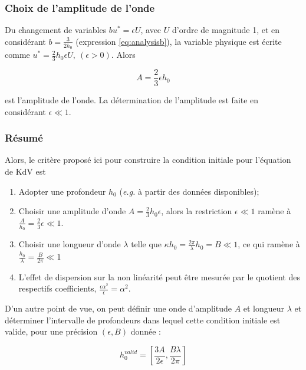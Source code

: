\subsubsection{Choix de l'amplitude de l'onde}

\indent Du changement de variables $bu^* = \epsilon U$, avec $U$ d'ordre de magnitude 1, et en considérant $b = \frac{3}{2h_0}$ (expression \ref{eq:analysisb}), la variable physique est écrite comme $u^* = \frac{2}{3}h_0\epsilon U, \ (\epsilon > 0)$. Alors

\begin{equation*}
A = \frac{2}{3}\epsilon h_0
\end{equation*}

\noindent est l'amplitude de l'onde. La détermination de l'amplitude est faite en considérant $\epsilon \ll 1$. 

\subsubsection{Résumé}

\indent Alors, le critère proposé ici pour construire la condition initiale pour l'équation de KdV est 

\begin{enumerate}
\item Adopter une profondeur $h_0$ (\emph{e.g.} à partir des données disponibles);
\item Choisir une amplitude d'onde $A = \frac{2}{3}h_0\epsilon$, alors la restriction $\epsilon \ll 1$ ramène à $\frac{A}{h_0} = \frac{2}{3}\epsilon \ll 1$.
\item Choisir une longueur d'onde $\lambda$ telle que $\kappa h_0 = \frac{2\pi}{\lambda}h_0 = B \ll 1$, ce qui ramène à $\frac{h_0}{\lambda} = \frac{B}{2\pi} \ll 1$
\item L'effet de dispersion sur la non linéarité peut être mesurée par le quotient des respectifs coefficients, $\frac{\epsilon \alpha^2}{\epsilon} = \alpha^2$.
\end{enumerate}

\indent D'un autre point de vue, on peut définir une onde d'amplitude  $A$ et longueur $\lambda$ et déterminer l'intervalle de profondeurs dans lequel cette condition initiale est valide, pour une précision $(\epsilon,B)$ donnée :

\begin{equation} 
\label{eq:hvalid}
h_0^{valid} = \left[ \frac{3A}{2\epsilon}, \frac{B\lambda}{2\pi}\right]
\end{equation}

